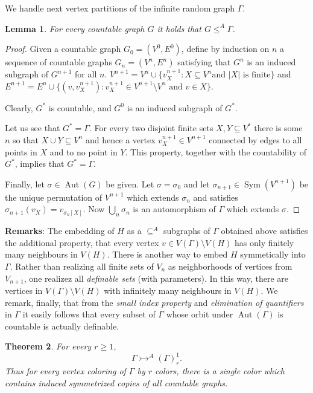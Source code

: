 \documentclass[11pt]{amsart}
\newcommand{\ars}{\rightarrowtail}
\newcommand{\sm}{\setminus}
\newcommand{\su}{\subseteq}
\newcommand{\aut}{\operatorname{Aut}}
\newcommand{\sym}{\operatorname{Sym}}
\newtheorem{theorem}{Theorem}[section]
\newtheorem{lemma}[theorem]{Lemma}
\begin{document}
We handle next vertex partitions of the infinite random graph $\Gamma$. 

\begin{lemma}\label{inGamma}
For every countable graph $G$ it holds that $G\le ^A \Gamma$.
 \end{lemma}

\begin{proof}
Given a countable graph $G_0=(V^0, E^0)$, define by induction on $n$
a sequence of countable graphs
$G_{n}=(V^{n},E^{n})$ satisfying that $G^n$ is an induced subgraph of
$G^{n+1}$ for all $n$. $V^{n+1}=V^n\cup\{v^{n+1}_X: X\su V^n \text{
  and } |X| \text{ is
  finite}\}$ and $E^{n+1}=E^n\cup\{(v,v^{n+1}_X):v^{n+1}_X\in
V^{n+1}\sm V^n \text{ and } v\in X\}$.

Clearly, $G^*$
is countable, and $G^0$ is an induced subgraph of $G^*$.

Let us see that $G^*=\Gamma$. For every two disjoint finite sets
$X,Y\su V^*$ there is some $n$ so that $X\cup Y\su V^n$ and hence
a vertex $v_X^{n+1}\in V^{n+1}$ connected by edges to all points
in $X$ and to no point in $Y$. This property, together with the
countability of $G^*$, implies that $G^*=\Gamma$.

Finally, let $\sigma\in \aut(G)$ be given. Let $\sigma=\sigma_0$
and let $\sigma_{n+1}\in \sym(V^{n+1})$ be the unique permutation
of $V^{n+1}$ which extends $\sigma_n$ and satisfies
$\sigma_{n+1}(v_X)=v_{\sigma_n[X]}$. Now $\bigcup_n \sigma_n$ is
an automorphism of $\Gamma$ which extends $\sigma$.
\end{proof}

\noindent \textbf{Remarks}: The embedding of $H$ as a $\su^A$
subgraphs of $\Gamma$ obtained above satisfies the additional
property, that every vertex $v\in V(\Gamma)\sm V(H)$ has only finitely
many neighbours in $V(H)$. There is another way to embed $H$
symmetically into $\Gamma$. Rather than realizing all finite sets of
$V_n$ as neighborhoods of vertices from $V_{n+1}$, one realizez all
\emph{definable sets} (with parameters). In this way, there are
vertices in $V(\Gamma)\sm V(H)$ with infinitely many neighbours in
$V(H)$.  We remark, finally, that from the \emph{small index property}
\cite{HHLS} and \emph{elimination of quantifiers} in $\Gamma$ it
easily follows that every subset of $\Gamma$ whose orbit under
$\aut(\Gamma)$ is countable is actually definable.


\begin{theorem}\label{Gamma}
 For every $r\ge 1$,
\[\Gamma \ars^A(\Gamma)^1_r.\]
Thus for every vertex coloring of $\Gamma$ by $r$
  colors, there is a single color which contains induced symmetrized
  copies of all countable graphs.
\end{theorem}
\end{document}
